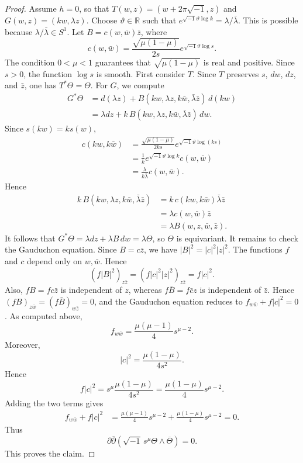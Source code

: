 \documentclass[12pt]{amsart}
\numberwithin{equation}{section}
\theoremstyle{remark}
\theoremstyle{definition}
\begin{document}
\begin{proof}
Assume $h=0$, so that $T(w,z)=(w+2\pi\sqrt{-1},z)$ and $G(w,z)=(kw,\lambda z)$. Choose $\vartheta\in\mathbb{R}$ such that $e^{\sqrt{-1}\vartheta\log k}=\lambda/\bar\lambda$. This is possible because $\lambda/\bar\lambda\in S^1$. Let $B=c(w,\bar w)\bar z$, where
\begin{equation*}
c(w,\bar w)
=
\frac{\sqrt{\mu(1-\mu)}}{2s}
e^{\sqrt{-1}\vartheta\log s}.
\end{equation*}
The condition $0<\mu<1$ guarantees that $\sqrt{\mu(1-\mu)}$ is real and
positive. Since $s>0$, the function $\log s$ is smooth.
First consider $T$. Since $T$ preserves $s$, $dw$, $dz$, and $\bar z$, one has $T^*\Theta=\Theta$.
For $G$, we compute
\begin{align*}
G^*\Theta
&=
d(\lambda z)
+
B(kw,\lambda z,k\bar w,\bar\lambda\bar z)\,d(kw)\\
&=
\lambda dz
+
k\,B(kw,\lambda z,k\bar w,\bar\lambda\bar z)\,dw.
\end{align*}
Since $s(kw)=ks(w)$,
\begin{align*}
c(kw,k\bar w)
&=
\frac{\sqrt{\mu(1-\mu)}}{2ks}
e^{\sqrt{-1}\vartheta\log(ks)}\\
&=
\frac{1}{k}
e^{\sqrt{-1}\vartheta\log k}
c(w,\bar w) \\
&= \frac{\lambda}{k\bar\lambda}c(w,\bar w).
\end{align*}
Hence
\begin{align*}
k\,B(kw,\lambda z,k\bar w,\bar\lambda\bar z)
&=
k\,c(kw,k\bar w)\bar\lambda\bar z\\
&=
\lambda c(w,\bar w)\bar z\\
&=
\lambda B(w,z,\bar w,\bar z).
\end{align*}
It follows that $G^*\Theta=\lambda dz+\lambda B\,dw=\lambda\Theta$, so $\Theta$ is equivariant. It remains to check the Gauduchon equation. Since $B=c\bar z$, we have
$
|B|^2=|c|^2|z|^2.
 $
The functions $f$ and $c$ depend only on $w,\bar w$. Hence
\begin{equation*}
(f|B|^2)_{z\bar z}
=
(f|c|^2|z|^2)_{z\bar z}
=
f|c|^2.
\end{equation*}
Also, $fB=fc\bar z$ is independent of $z$, whereas $f\bar B=f\bar c z$ is independent of $\bar z$. Hence $(fB)_{z\bar w}=(f\bar B)_{w\bar z}=0$, and the Gauduchon equation reduces to $f_{w\bar w}+f|c|^2=0$.
As computed above,
\begin{equation*}
f_{w\bar w}
=
\frac{\mu(\mu-1)}{4}s^{\mu-2}.
\end{equation*}
Moreover,
\begin{equation*}
|c|^2
=
\frac{\mu(1-\mu)}{4s^2}.
\end{equation*}
Hence
\begin{equation*}
f|c|^2
=
s^\mu\frac{\mu(1-\mu)}{4s^2}
=
\frac{\mu(1-\mu)}{4}s^{\mu-2}.
\end{equation*}
Adding the two terms gives
\begin{align*}
f_{w\bar w}+f|c|^2
&=
\frac{\mu(\mu-1)}{4}s^{\mu-2}
+
\frac{\mu(1-\mu)}{4}s^{\mu-2}=0.
\end{align*}
Thus
$$
\partial\overline{\partial}\!\left(\sqrt{-1}\,s^\mu\Theta\wedge\overline{\Theta}\right)=0.
$$
This proves the claim.
\end{proof}
\end{document}
